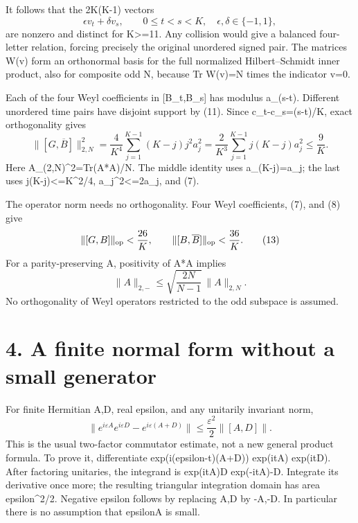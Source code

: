 \documentclass[11pt,a4paper]{article}
\begin{document}
It follows that the 2K(K-1) vectors \[
 \epsilon v_t+\delta v_s,\qquad 0\leq t<s<K,\quad
 \epsilon,\delta\in\{-1,1\},                                  \tag{11}
\] are nonzero and distinct for K\textgreater=11. Any collision would give a balanced four-letter relation, forcing precisely the original unordered signed pair. The matrices W(v) form an orthonormal basis for the full normalized Hilbert--Schmidt inner product, also for composite odd N, because Tr W(v)=N times the indicator v=0.

Each of the four Weyl coefficients in {[}B\_t,B\_s{]} has modulus a\_(s-t). Different unordered time pairs have disjoint support by (11). Since c\_t-c\_s=(s-t)/K, exact orthogonality gives \[
 \|[G,\overline B]\|_{2,N}^2
 =\frac4{K^4}\sum_{j=1}^{K-1}(K-j)j^2a_j^2
 =\frac2{K^3}\sum_{j=1}^{K-1}j(K-j)a_j^2
 \leq\frac9K.                                                  \tag{12}
\] Here \textbar\textbar A\textbar\textbar\_(2,N)\^{}2=Tr(A*A)/N. The middle identity uses a\_(K-j)=a\_j; the last uses j(K-j)\textless=K\^{}2/4, a\_j\^{}2\textless=2a\_j, and (7).

The operator norm needs no orthogonality. Four Weyl coefficients, (7), and (8) give \[
 \|[G,B]\|_{\rm op}<\frac{26}{K},\qquad
 \|[B,\overline B]\|_{\rm op}<\frac{36}{K}.                     \tag{13}
\] For a parity-preserving A, positivity of A*A implies \[
 \|A\|_{2,-}\leq\sqrt{\frac{2N}{N-1}}\,\|A\|_{2,N}.             \tag{14}
\] No orthogonality of Weyl operators restricted to the odd subspace is assumed.

\hypertarget{a-finite-normal-form-without-a-small-generator}{%
\section{4. A finite normal form without a small generator}\label{a-finite-normal-form-without-a-small-generator}}

For finite Hermitian A,D, real epsilon, and any unitarily invariant norm, \[
 \|e^{i\varepsilon A}e^{i\varepsilon D}
           -e^{i\varepsilon(A+D)}\|
 \leq\frac{\varepsilon^2}{2}\|[A,D]\|.                          \tag{15}
\] This is the usual two-factor commutator estimate, not a new general product formula. To prove it, differentiate exp(i(epsilon-t)(A+D)) exp(itA) exp(itD). After factoring unitaries, the integrand is exp(itA)D exp(-itA)-D. Integrate its derivative once more; the resulting triangular integration domain has area epsilon\^{}2/2. Negative epsilon follows by replacing A,D by -A,-D. In particular there is no assumption that \textbar epsilon\textbar*\textbar\textbar A\textbar\textbar{} is small.
\end{document}
